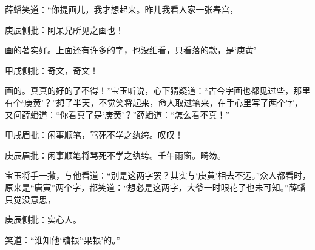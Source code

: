 \begin{parag}
    薛蟠笑道：“你提画儿，我才想起来。昨儿我看人家一张春宫，\begin{note}庚辰侧批：阿呆兄所见之画也！\end{note}画的著实好。上面还有许多的字，也没细看，只看落的款，是‘庚黄’\begin{note}甲戌侧批：奇文，奇文！\end{note}画的。真真的好的了不得！”宝玉听说，心下猜疑道：“古今字画也都见过些，那里有个‘庚黄’？”想了半天，不觉笑将起来，命人取过笔来，在手心里写了两个字，又问薛蟠道：“你看真了是‘庚黄’？”薛蟠道：“怎么看不真！”\begin{note}甲戌眉批：闲事顺笔，骂死不学之纨绔。叹叹！\end{note}\begin{note}庚辰眉批：闲事顺笔将骂死不学之纨绔。壬午雨窗。畸笏。\end{note}宝玉将手一撒，与他看道：“别是这两字罢？其实与‘庚黄’相去不远。”众人都看时，原来是“唐寅”两个字，都笑道：“想必是这两字，大爷一时眼花了也未可知。”薛蟠只觉没意思，\begin{note}庚辰侧批：实心人。\end{note}笑道：“谁知他‘糖银’‘果银’的。”
\end{parag}


